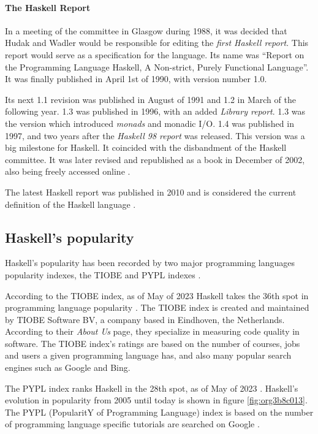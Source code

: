 \documentclass[a4paper, titlepage, twoside]{article}
\begin{document}
\paragraph*{The Haskell Report}
\label{sec:org538da45}

In a meeting of the committee in Glasgow during 1988, it was decided that Hudak and Wadler would be responsible for editing the \emph{first Haskell report}. This report would serve as a specification for the language. Its name was ``Report on the Programming Language Haskell, A Non-strict, Purely Functional Language''. It was finally published in April 1st of 1990, with version number 1.0.

Its next 1.1 revision was published in August of 1991 and 1.2 in March of the following year. 1.3 was published in 1996, with an added \emph{Library report}. 1.3 was the version which introduced \emph{monads} and monadic I/O. 1.4 was published in 1997, and two years after the \emph{Haskell 98 report} was released. This version was a big milestone for Haskell. It coincided with the disbandment of the Haskell committee. It was later revised and republished as a book in December of 2002, also being freely accessed online \autocite{hudakHistoryHaskellBeing2007}.

The latest Haskell report was published in 2010 and is considered the current definition of the Haskell language \autocite{marlowHaskell2010Language2010,haskellwikiHaskellHaskellWiki2023}.

\subsection{Haskell's popularity}
\label{sec:orgf8a51ad}

Haskell's popularity has been recorded by two major programming languages popularity indexes, the TIOBE and PYPL indexes \autocites{carbonnellePYPLPopularitYProgramming2023}[][]{tiobeTIOBEIndex2023}.

According to the TIOBE index, as of May of 2023 Haskell takes the 36th spot in programming language popularity \autocite{tiobeTIOBEIndex2023}. The TIOBE index is created and maintained by TIOBE Software BV, a company based in Eindhoven, the Netherlands. According to their \emph{About Us} page, they specialize in measuring code quality in software. The TIOBE index's ratings are based on the number of courses, jobs and users a given programming language has, and also many popular search engines such as Google and Bing.

The PYPL index ranks Haskell in the 28th spot, as of May of 2023 \autocite{carbonnellePYPLPopularitYProgramming2023}. Haskell's evolution in popularity from 2005 until today is shown in figure \ref{fig:org3b8c013}. The PYPL (PopularitY of Programming Language) index is based on the number of programming language specific tutorials are searched on Google \autocite{carbonnellePYPLPopularitYProgramming2023}.
\end{document}
